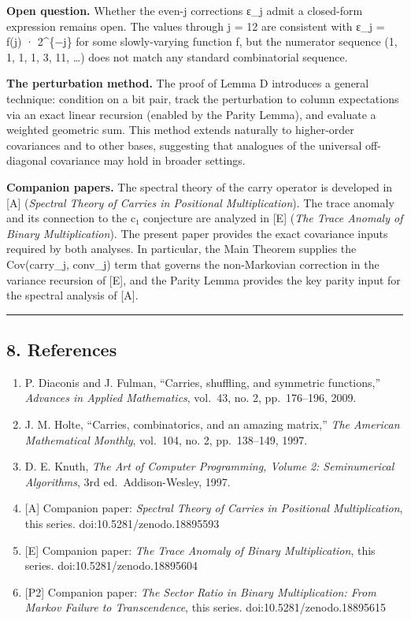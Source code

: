 \documentclass[
  11pt,
]{article}
\begin{document}
\textbf{Open question.} Whether the even-j corrections ε\_j admit a closed-form
expression remains open. The values through j = 12 are consistent with ε\_j =
f(j) · 2\^{}\{−j\} for some slowly-varying function f, but the numerator
sequence (1, 1, 1, 1, 3, 11, \ldots) does not match any standard combinatorial
sequence.

\textbf{The perturbation method.} The proof of Lemma D introduces a general
technique: condition on a bit pair, track the perturbation to column
expectations via an exact linear recursion (enabled by the Parity Lemma), and
evaluate a weighted geometric sum. This method extends naturally to higher-order
covariances and to other bases, suggesting that analogues of the universal
off-diagonal covariance may hold in broader settings.

\textbf{Companion papers.} The spectral theory of the carry operator is
developed in {[}A{]} (\emph{Spectral Theory of Carries in Positional
Multiplication}). The trace anomaly and its connection to the c₁ conjecture are
analyzed in {[}E{]} (\emph{The Trace Anomaly of Binary Multiplication}). The
present paper provides the exact covariance inputs required by both analyses. In
particular, the Main Theorem supplies the Cov(carry\_j, conv\_j) term that
governs the non-Markovian correction in the variance recursion of {[}E{]}, and
the Parity Lemma provides the key parity input for the spectral analysis of
{[}A{]}.

\begin{center}\rule{0.5\linewidth}{0.5pt}\end{center}

\newpage

\subsection{8. References}\label{references}

\begin{enumerate}
\def\labelenumi{\arabic{enumi}.}
\item
  P. Diaconis and J. Fulman, ``Carries, shuffling, and symmetric functions,''
  \emph{Advances in Applied Mathematics}, vol.~43, no. 2, pp.~176--196, 2009.
\item
  J. M. Holte, ``Carries, combinatorics, and an amazing matrix,'' \emph{The
  American Mathematical Monthly}, vol.~104, no. 2, pp.~138--149, 1997.
\item
  D. E. Knuth, \emph{The Art of Computer Programming, Volume 2: Seminumerical
  Algorithms}, 3rd ed.~Addison-Wesley, 1997.
\item
  {[}A{]} Companion paper: \emph{Spectral Theory of Carries in Positional
  Multiplication}, this series. doi:10.5281/zenodo.18895593
\item
  {[}E{]} Companion paper: \emph{The Trace Anomaly of Binary Multiplication},
  this series. doi:10.5281/zenodo.18895604
\item
  {[}P2{]} Companion paper: \emph{The Sector Ratio in Binary Multiplication:
  From Markov Failure to Transcendence}, this series.
  doi:10.5281/zenodo.18895615
\end{enumerate}
\end{document}
